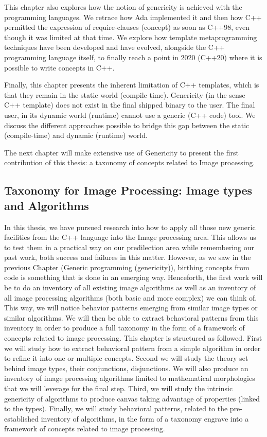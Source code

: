This chapter also explores how the notion of genericity is achieved with the programming languages. We retrace how Ada
implemented it and then how C++ permitted the expression of require-clauses (concept) as soon as C++98, even though it
was limited at that time. We explore how template metaprogramming techniques have been developed and have evolved,
alongside the C++ programming language itself, to finally reach a point in 2020 (C++20) where it is possible to write
concepts in C++.

Finally, this chapter presents the inherent limitation of C++ templates, which is that they remain in the static world
(compile time). Genericity (in the sense C++ template) does not exist in the final shipped binary to the user. The final
user, in its dynamic world (runtime) cannot use a generic (C++ code) tool. We discuss the different approaches possible
to bridge this gap between the static (compile-time) and dynamic (runtime) world.

The next chapter will make extensive use of Genericity to present the first contribution of this thesis: a taxonomy of
concepts related to Image processing.


\subsection*{Taxonomy for Image Processing: Image types and Algorithms}


In this thesis, we have pursued research into how to apply all those new generic facilities from the C++ language into
the Image processing area. This allows us to test them in a practical way on our predilection area while remembering our
past work, both success and failures in this matter. However, as we saw in the previous Chapter (Generic programming
(genericity)), birthing concepts from code is something that is done in an emerging way. Henceforth, the first work will
be to do an inventory of all existing image algorithms as well as an inventory of all image processing algorithms (both
basic and more complex) we can think of. This way, we will notice behavior patterns emerging from similar image types or
similar algorithms. We will then be able to extract behavioral patterns from this inventory in order to produce a full
taxonomy in the form of a framework of concepts related to image processing. This chapter is structured as followed.
First we will study how to extract behavioral pattern from a simple algorithm in order to refine it into one or multiple
concepts. Second we will study the theory set behind image types, their conjunctions, disjunctions. We will also produce
an inventory of image processing algorithms limited to mathematical morphologies that we will leverage for the final
step. Third, we will study the intrinsic genericity of algorithms to produce canvas taking advantage of properties
(linked to the types). Finally, we will study behavioral patterns, related to the pre-established inventory of
algorithms, in the form of a taxonomy engrave into a framework of concepts related to image processing.

